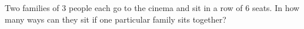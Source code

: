 Two families of $3$ people each go to the cinema and sit in a row of $6$ seats. In how many ways can they sit if one particular family sits together?
